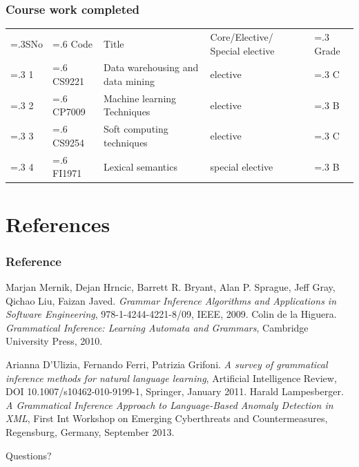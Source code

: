 \documentclass[11pt]{beamer}
\begin{document}
\begin{frame}
  \frametitle{Course work completed}
  \small
  \begin{tabularx}{1.0\linewidth}{
      >{\hsize=.3\hsize}X
      >{\hsize=.6\hsize}X
      >{\hsize=2.2\hsize}X
      >{\hsize=1.6\hsize}X
      >{\hsize=.3\hsize}X} 
      \rowcolor{LightRed}SNo & Code & Title & Core/Elective/ Special elective & Grade\\ 
      \rowcolor{LightBlue}   1 & CS9221 &  Data warehousing and data mining & elective & C\\
       \rowcolor{LightGreen}   2 & CP7009 & Machine learning Techniques & elective & B\\
      \rowcolor{LightBlue}   3 & CS9254 & Soft computing techniques & elective & C\\
      \rowcolor{LightGreen}   4 & FI1971 & Lexical semantics & special elective & B\\
  \end{tabularx}
\end{frame}

\section{References}

\begin{frame}[allowframebreaks]
  \frametitle<presentation>{Reference}
  \small
  \begin{thebibliography}{10}
    \beamertemplatebookbibitems
   Marjan Mernik, Dejan Hrncic, Barrett R. Bryant,
    Alan P. Sprague, Jeff Gray, Qichao Liu, Faizan Javed.
    \emph{Grammar Inference Algorithms and Applications in Software
      Engineering}, 978-1-4244-4221-8/09, IEEE, 2009.
   Colin de la Higuera.
    \emph{Grammatical Inference: Learning Automata and Grammars},
    Cambridge University Press, 2010.
 
    \beamertemplatearticlebibitems

   Arianna D'Ulizia, Fernando Ferri, Patrizia
    Grifoni.
    \emph{A survey of grammatical inference methods for natural
      language learning},
    Artificial Intelligence Review, DOI 10.1007/s10462-010-9199-1,
    Springer, January 2011.
   Harald Lampesberger. 
    \emph{A Grammatical Inference Approach to Language-Based Anomaly
      Detection in XML},
    First Int Workshop on Emerging Cyberthreats and Countermeasures,
    Regensburg, Germany, September 2013.
  \end{thebibliography}
\end{frame}

\begin{frame}
  \vfill
  \begin{center}
    Questions?
  \end{center}
  \vfill
  
\end{frame}
\end{document}
